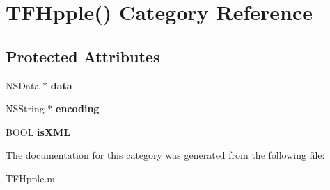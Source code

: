 \section{T\+F\+Hpple() Category Reference}
\label{category_t_f_hpple_07_08}
\subsection*{Protected Attributes}
\begin{DoxyCompactItemize}
\item 
N\+S\+Data $\ast$ {\bfseries data}\label{category_t_f_hpple_07_08_a674b2440c6e918dcf6b323786bd29ecb}

\item 
N\+S\+String $\ast$ {\bfseries encoding}\label{category_t_f_hpple_07_08_a0b3df7514a4fe4565450e3a19f390e0a}

\item 
B\+O\+O\+L {\bfseries is\+X\+M\+L}\label{category_t_f_hpple_07_08_ad2ae7e483fc2540b363e72a46a4cb196}

\end{DoxyCompactItemize}


The documentation for this category was generated from the following file\+:\begin{DoxyCompactItemize}
\item 
T\+F\+Hpple.\+m\end{DoxyCompactItemize}
